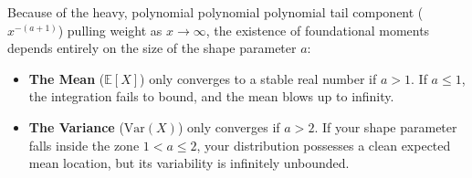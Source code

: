 \documentclass{article}
\begin{document}
\begin{tcolorbox}[colback=red!5!white, colframe=red!60!black, title=Critical Mathematical Boundary Conditions]
Because of the heavy, polynomial polynomial polynomial tail component ($x^{-(a+1)}$) pulling weight as $x \to \infty$, the existence of foundational moments depends entirely on the size of the shape parameter $a$:
\begin{itemize}
    \item \textbf{The Mean} ($\mathbb{E}[X]$) only converges to a stable real number if \textbf{$a > 1$}. If $a \le 1$, the integration fails to bound, and the mean blows up to infinity.
    \item \textbf{The Variance} ($\text{Var}(X)$) only converges if \textbf{$a > 2$}. If your shape parameter falls inside the zone $1 < a \le 2$, your distribution possesses a clean expected mean location, but its variability is infinitely unbounded.
\end{itemize}
\end{tcolorbox}
\end{document}
